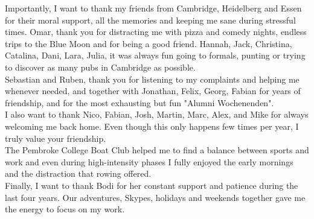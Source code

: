 \begin{acknowledgements}
\newpage
\thispagestyle{empty}
 
Importantly, I want to thank my friends from Cambridge, Heidelberg and Essen for their moral support, all the memories and keeping me sane during stressful times. Omar, thank you for distracting me with pizza and comedy nights, endless trips to the Blue Moon and for being a good friend. Hannah, Jack, Christina, Catalina, Dani, Lara, Julia, it was always fun going to formals, punting or trying to discover as many pubs in Cambridge as possible.\\

Sebastian and Ruben, thank you for listening to my complaints and helping me whenever needed, and together with Jonathan, Felix, Georg, Fabian for years of friendship, and for the most exhausting but fun "Alumni Wochenenden".  \\

I also want to thank Nico, Fabian, Josh, Martin, Marc, Alex, and Mike for always welcoming me back home. Even though this only happens few times per year, I truly value your friendship. \\

The Pembroke College Boat Club helped me to find a balance between sports and work and even during high-intensity phases I fully enjoyed the early mornings and the distraction that rowing offered. \\

Finally, I want to thank Bodi for her constant support and patience during the last four years. Our adventures, Skypes, holidays and weekends together gave me the energy to focus on my work.

\end{acknowledgements}
